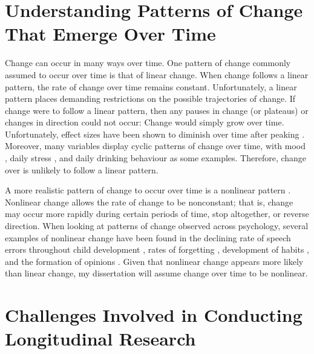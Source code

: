 \documentclass[
12pt, %
twoside,
english]{guelphthesis}
\begin{document}
\hypertarget{understanding-patterns-of-change-that-emerge-over-time}{%
\section{Understanding Patterns of Change That Emerge Over Time}\label{understanding-patterns-of-change-that-emerge-over-time}}

Change can occur in many ways over time. One pattern of change commonly assumed to occur over time is that of linear change. When change follows a linear pattern, the rate of change over time remains constant. Unfortunately, a linear pattern places demanding restrictions on the possible trajectories of change. If change were to follow a linear pattern, then any pauses in change (or plateaus) or changes in direction could not occur: Change would simply grow over time. Unfortunately, effect sizes have been shown to diminish over time after peaking \autocites[for meta-analytic examples, see][]{cohen1993,griffeth2000,hom1992,riketta2008,steel1984,steel1990}. Moreover, many variables display cyclic patterns of change over time, with mood \autocite{larsen1990}, daily stress \autocite{bodenmann2010}, and daily drinking behaviour \autocite{huh2015} as some examples. Therefore, change over is unlikely to follow a linear pattern.

A more realistic pattern of change to occur over time is a nonlinear pattern \autocite[for a review, see][]{cudeck2007}. Nonlinear change allows the rate of change to be nonconstant; that is, change may occur more rapidly during certain periods of time, stop altogether, or reverse direction. When looking at patterns of change observed across psychology, several examples of nonlinear change have been found in the declining rate of speech errors throughout child development \autocite{burchinal1991}, rates of forgetting \autocite{murre2015}, development of habits \autocite{fournier2017}, and the formation of opinions \autocite{xia2020}. Given that nonlinear change appears more likely than linear change, my dissertation will assume change over time to be nonlinear.

\hypertarget{challenges-involved-in-conducting-longitudinal-research}{%
\section{Challenges Involved in Conducting Longitudinal Research}\label{challenges-involved-in-conducting-longitudinal-research}}
\end{document}
